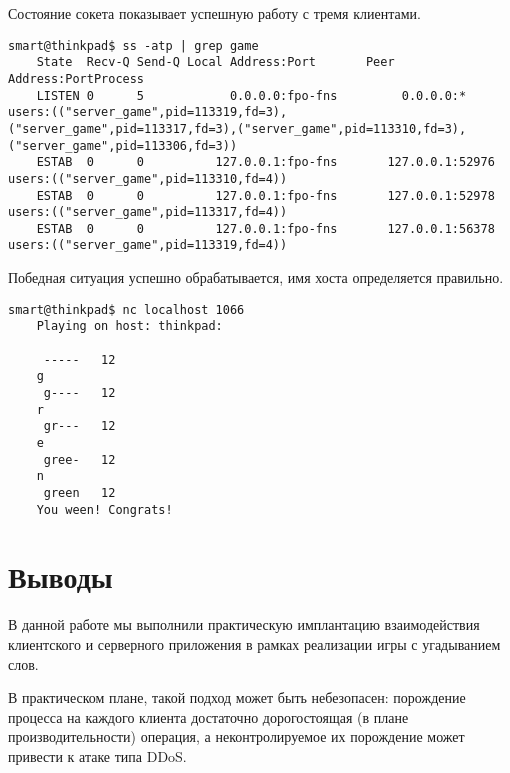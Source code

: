 Состояние сокета показывает успешную работу с тремя клиентами.
\begin{Verbatim}[frame=single,breaklines=true,breakanywhere=true]
    smart@thinkpad$ ss -atp | grep game
    State  Recv-Q Send-Q Local Address:Port       Peer Address:PortProcess
    LISTEN 0      5            0.0.0.0:fpo-fns         0.0.0.0:*           users:(("server_game",pid=113319,fd=3),("server_game",pid=113317,fd=3),("server_game",pid=113310,fd=3),("server_game",pid=113306,fd=3))
    ESTAB  0      0          127.0.0.1:fpo-fns       127.0.0.1:52976       users:(("server_game",pid=113310,fd=4))                                                                                                
    ESTAB  0      0          127.0.0.1:fpo-fns       127.0.0.1:52978       users:(("server_game",pid=113317,fd=4))                                                                                                
    ESTAB  0      0          127.0.0.1:fpo-fns       127.0.0.1:56378       users:(("server_game",pid=113319,fd=4))
\end{Verbatim}

Победная ситуация успешно обрабатывается, имя хоста определяется правильно.
\begin{Verbatim}[frame=single,breaklines=true,breakanywhere=true]
    smart@thinkpad$ nc localhost 1066
    Playing on host: thinkpad:
    
     -----   12
    g
     g----   12
    r
     gr---   12
    e
     gree-   12
    n
     green   12
    You ween! Congrats!
\end{Verbatim}

\section*{Выводы}

В данной работе мы выполнили практическую имплантацию взаимодействия клиентского и серверного приложения в рамках реализации игры с угадыванием слов.

В практическом плане, такой подход может быть небезопасен: порождение процесса на каждого клиента достаточно дорогостоящая (в плане производительности) операция, а неконтролируемое их порождение может привести к атаке типа DDoS.
